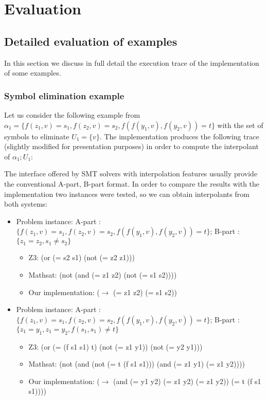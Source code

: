 \section{Evaluation}

\subsection{Detailed evaluation of examples}

In this section we discuss in full detail the execution trace
of the implementation of some examples. 

\subsubsection{Symbol elimination example}

Let us consider the following example from \cite{KAPUR2017} 
$\alpha_1 = \{f(z_1, v) = s_1, f(z_2, v) = s_2, f(f(y_1, v), f(y_2, v)) = t\}$
with the set of symbols to eliminate $U_1 = \{v\}$. The implementation produces the following
trace (slightly modified for presentation purposes) in order to compute 
the interpolant of $\alpha_1; U_1$:



The interface offered by SMT solvers with interpolation features usually provide the 
conventional A-part, B-part format. In order to compare the results with the implementation two 
instances were tested, so we can obtain interpolants from both systems:

\begin{itemize}
\item Problem instance: A-part : $\{f(z_1, v) = s_1, f(z_2, v) 
  = s_2, f(f(y_1, v), f(y_2, v)) = t\}$; B-part : 
  $\{z_1 = z_2, s_1 \neq s_2 \}$
\begin{itemize}
\item Z3: (or (= s2 s1) (not (= z2 z1)))
\item Mathsat: (not (and (= z1 z2) (not (= s1 s2))))
\item Our implementation: ($\rightarrow$ (= z1 z2) (= s1 s2))
\end{itemize}

\item Problem instance: A-part : $\{f(z_1, v) = s_1, f(z_2, v) 
  = s_2, f(f(y_1, v), f(y_2, v)) = t\}$; 
  B-part : $\{z_1 = y_1, z_1 = y_2, f(s_1, s_1) \neq t\}$
\begin{itemize}
\item Z3: (or (= (f s1 s1) t) (not (= z1 y1)) (not (= y2 y1)))
\item Mathsat: (not (and (not (= t (f s1 s1))) (and (= z1 y1) (= z1 y2))))
\item Our implementation: ($\rightarrow$ (and (= y1 y2) (= z1 y2) (= z1 y2)) (= t (f s1 s1))))
\end{itemize}

\end{itemize}

